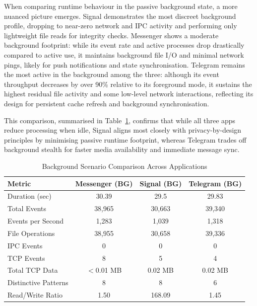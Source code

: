 \documentclass[a4paper,12pt]{report}
\begin{document}
When comparing runtime behaviour in the passive background state, a more nuanced picture emerges. Signal demonstrates the most discreet background profile, dropping to near-zero network and IPC activity and performing only lightweight file reads for integrity checks. Messenger shows a moderate background footprint: while its event rate and active processes drop drastically compared to active use, it maintains background file I/O and minimal network pings, likely for push notifications and state synchronisation. Telegram remains the most active in the background among the three: although its event throughput decreases by over 90\% relative to its foreground mode, it sustains the highest residual file activity and some low-level network interactions, reflecting its design for persistent cache refresh and background synchronisation.

This comparison, summarised in Table~\ref{tab:comparison_bg_only}, confirms that while all three apps reduce processing when idle, Signal aligns most closely with privacy-by-design principles by minimising passive runtime footprint, whereas Telegram trades off background stealth for faster media availability and immediate message sync.

\begin{table}[H]
    \centering
    \caption{Background Scenario Comparison Across Applications}
    \label{tab:comparison_bg_only}
    \begin{tabular}{|l|c|c|c|}
        \hline
        \textbf{Metric} & \textbf{Messenger (BG)} & \textbf{Signal (BG)} & \textbf{Telegram (BG)} \\
        \hline
        Duration (sec) & 30.39 & 29.5 & 29.83 \\
        Total Events & 38,965 & 30,663 & 39,340 \\
        Events per Second & 1,283 & 1,039 & 1,318 \\
        File Operations & 38,955 & 30,658 & 39,336 \\
        IPC Events & 0 & 0 & 0 \\
        TCP Events & 8 & 5 & 4 \\
        Total TCP Data & $<$0.01 MB & 0.02 MB & 0.02 MB \\
        Distinctive Patterns & 8 & 8 & 6 \\
        Read/Write Ratio & 1.50 & 168.09 & 1.45 \\
        \hline
    \end{tabular}
\end{table}
\end{document}
